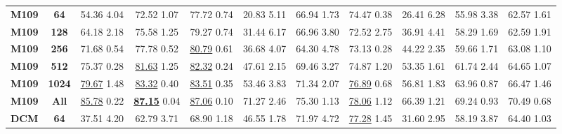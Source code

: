 \documentclass{article}
\begin{document}
\begin{table*}
\begin{tabular}{l|c|ccc|ccc|ccc}
    \noalign{\smallskip}
    \hline
    \noalign{\smallskip}

    \textbf{M109} & \textbf{64}   
    & 54.36 {\tiny 4.04} & 72.52 {\tiny 1.07} & 77.72 {\tiny 0.74}
    & 20.83 {\tiny 5.11} & 66.94 {\tiny 1.73} & 74.47 {\tiny 0.38} 
    & 26.41 {\tiny 6.28} & 55.98 {\tiny 3.38} & 62.57 {\tiny 1.61} \\
    
    \textbf{M109} & \textbf{128}
    & 64.18 {\tiny 2.18} & 75.58 {\tiny 1.25} & 79.27 {\tiny 0.74} 
    & 31.44 {\tiny 6.17} & 66.96 {\tiny 3.80} & 72.52 {\tiny 2.75} 
    & 36.91 {\tiny 4.41} & 58.29 {\tiny 1.69} & 62.59 {\tiny 1.91} \\
    
    \textbf{M109} & \textbf{256}   
    & 71.68 {\tiny 0.54} & 77.78 {\tiny 0.52} & \underline{80.79} {\tiny 0.61} 
    & 36.68 {\tiny 4.07} & 64.30 {\tiny 4.78} & 73.13 {\tiny 0.28} 
    & 44.22 {\tiny 2.35} & 59.66 {\tiny 1.71} & 63.08 {\tiny 1.10}\\
    
    \textbf{M109} & \textbf{512}   
    & 75.37 {\tiny 0.28} & \underline{81.63} {\tiny 1.25} & \underline{82.32} {\tiny 0.24} 
    & 47.61 {\tiny 2.15} & 69.46 {\tiny 3.27} & 74.87 {\tiny 1.20} 
    & 53.35 {\tiny 1.61} & 61.74 {\tiny 2.44} & 64.65 {\tiny 1.07} \\
    
    \textbf{M109} & \textbf{1024}   
    & \underline{79.67} {\tiny 1.48} & \underline{83.32} {\tiny 0.40} & \underline{83.51} {\tiny 0.35} 
    & 53.46 {\tiny 3.83} & 71.34 {\tiny 2.07} & \underline{76.89} {\tiny 0.68} 
    & 56.81 {\tiny 1.83} & 63.96 {\tiny 0.87} & 66.47 {\tiny 1.46} \\
    
    \textbf{M109} & \textbf{All}
    & \underline{85.78} {\tiny 0.22} & \underline{\textbf{87.15}} {\tiny 0.04} & \underline{87.06} {\tiny 0.10}	
    & 71.27 {\tiny 2.46} & 75.30 {\tiny 1.13} & \underline{78.06} {\tiny 1.12}
    & 66.39 {\tiny 1.21} & 69.24 {\tiny 0.93} & 70.49 {\tiny 0.68} \\

    \noalign{\smallskip}
    \hline
    \noalign{\smallskip}

    \textbf{DCM} & \textbf{64}   
    & 37.51 {\tiny 4.20} & 62.79 {\tiny 3.71} & 68.90 {\tiny 1.18} 
    & 46.55 {\tiny 1.78} & 71.97 {\tiny 4.72} & \underline{77.28} {\tiny 1.45} 
    & 31.60 {\tiny 2.95} & 58.19 {\tiny 3.87} & 64.40 {\tiny 1.03} \\
    

\end{tabular}
\end{table*}
\end{document}

